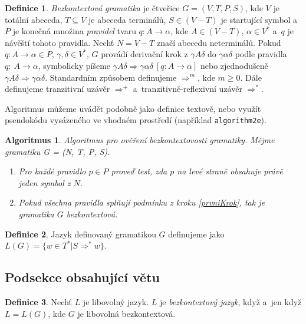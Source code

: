 \documentclass[11pt, a4paper, twocolumn]{article}
\theoremstyle{definition}
\newtheorem{definice}{Definice}[section]
\theoremstyle{plain}
\newtheorem{algoritmus}{Algoritmus}[section]
\begin{document}
	\begin{definice} \label{def_bezkontextova_gramatika}
	\emph{Bezkontextová gramatika} je čtveřice $G=(V,T,P,S)$, kde $V$ je totální abeceda,
	$T \subseteq V$ je abeceda terminálů, $S \in (V-T)$ je startující symbol a~$P$ je konečná množina \emph{pravidel} tvaru $q: A \rightarrow \alpha$, kde $A \in (V - T)$, $\alpha \in V^*$ a~$q$ je návěští tohoto pravidla. Nechť $N = V - T$ značí abecedu neterminálů.
	Pokud $q\!: A \rightarrow \alpha \in P$, $\gamma,\delta \in V^*$, $G$ provádí derivační krok z $\gamma A \delta$ do $\gamma \alpha \delta$ podle pravidla $q\!:\ A \rightarrow \alpha$, symbolicky píšeme $\gamma A \delta \Rightarrow \gamma \alpha \delta\ [q\!: A \rightarrow \alpha]$ nebo zjednodušeně $\gamma A \delta \Rightarrow \gamma \alpha \delta$. Standardním způsobem definujeme $\Rightarrow^m$, kde $m \geq 0$. Dále definujeme tranzitivní uzávěr $\Rightarrow^+$ a~tranzitivně-reflexivní uzávěr $\Rightarrow^*$.
	\end{definice}

	Algoritmus můžeme uvádět podobně jako definice textově, nebo využít pseudokódu vysázeného ve vhodném prostředí (například \texttt{algorithm2e}).

	\begin{algoritmus}
	Algoritmus pro ověření bezkontextovosti gramatiky. Mějme gramatiku G = (N, T, P, S).
		\begin{enumerate}
	 		\item \label{prvniKrok} Pro každé pravidlo $p \in P$ proveď test, zda $p$ na levé straně obsahuje právě jeden symbol z $N$.
	 		\item Pokud všechna pravidla splňují podmínku z kroku \ref{prvniKrok}, tak je gramatika $G$ bezkontextová.
	 	\end{enumerate}
	\end{algoritmus}

	\begin{definice}
	Jazyk definovaný gramatikou $G$ definujeme jako $L(G) = \{w \in T^*|S \Rightarrow^* w\}$.
	\end{definice}

	\subsection{Podsekce obsahující větu}

	\begin{definice}
	Nechť $L$ je libovolný jazyk. $L$ je \emph{bezkontextový jazyk}, když a~jen když $L = L(G)$, kde $G$ je libovolná bezkontextová.
	\end{definice}
\end{document}
